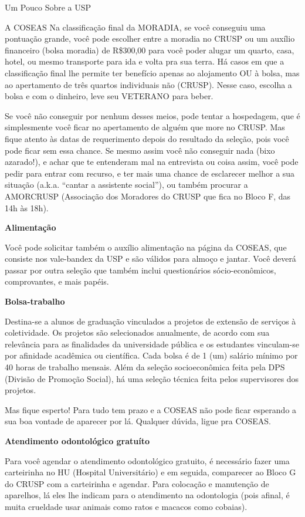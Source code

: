 \begin{secao}{Um Pouco Sobre a USP}
\begin{subsecao}{A COSEAS}
Na classificação final da MORADIA, se você conseguiu uma pontuação grande, você
pode escolher entre a moradia no CRUSP ou um auxílio financeiro (bolsa moradia)
de R\$300,00 para você poder alugar um quarto, casa, hotel, ou mesmo transporte
para ida e volta pra sua terra.  Há casos em que a classificação final lhe
permite ter benefício apenas ao alojamento OU à bolsa, mas ao apertamento de
três quartos individuais não (CRUSP). Nesse caso, escolha a bolsa e com o
dinheiro, leve seu VETERANO para beber.

Se você não conseguir por nenhum desses meios, pode tentar a hospedagem, que é
simplesmente você ficar no apertamento de alguém que more no CRUSP. Mas fique
atento às datas de requerimento depois do resultado da seleção, pois você pode
ficar sem essa chance. Se mesmo assim você não conseguir nada (bixo azarado!),
e achar que te entenderam mal na entrevista ou coisa assim, você pode pedir para
entrar com recurso, e ter mais uma chance de esclarecer melhor a sua situação
(a.k.a. “cantar a assistente social”), ou também procurar a
AMORCRUSP (Associação dos Moradores do CRUSP que fica no Bloco F, das 14h às 18h).

{\bf Alimentação}

Você pode solicitar também o auxílio alimentação na página da COSEAS, que
consiste nos vale-bandex da USP e são válidos para almoço e jantar. Você deverá
passar por outra seleção que também inclui questionários sócio-econômicos,
comprovantes, e mais papéis.

{\bf Bolsa-trabalho}

Destina-se a alunos de graduação vinculados a projetos de extensão de serviços à
coletividade. Os projetos são selecionados anualmente, de acordo com sua relevância
para as finalidades da universidade pública e os estudantes vinculam-se por
afinidade acadêmica ou científica. Cada bolsa é de 1 (um) salário mínimo por
40 horas de trabalho mensais. Além da seleção socioeconômica feita pela
DPS (Divisão de Promoção Social), há uma seleção técnica feita pelos supervisores
dos projetos.

Mas fique esperto! Para tudo tem prazo e a COSEAS não pode ficar esperando a sua
boa vontade de aparecer por lá. Qualquer dúvida, ligue pra COSEAS.

{\bf Atendimento odontológico gratuíto}

Para você agendar o atendimento odontológico gratuito, é necessário fazer uma
carteirinha no HU (Hospital Universitário) e em seguida, comparecer ao Bloco G
do CRUSP com a carteirinha e agendar. Para colocação e manutenção de aparelhos,
lá eles lhe indicam para o atendimento na odontologia (pois afinal, é muita
crueldade usar animais como ratos e macacos como cobaias). 


\end{subsecao}
\end{secao}
